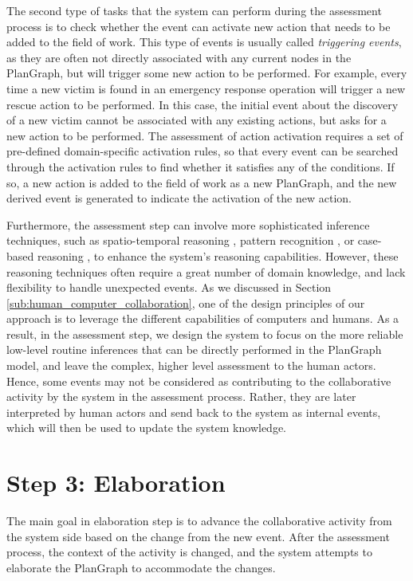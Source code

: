The second type of tasks that the system can perform during the assessment process is to check whether the event can activate new action that needs to be added to the field of work. This type of events is usually called \emph{triggering events}, as they are often not directly associated with any current nodes in the PlanGraph, but will trigger some new action to be performed. For example, every time a new victim is found in an emergency response operation will trigger a new rescue action to be performed. In this case, the initial event about the discovery of a new victim cannot be associated with any existing actions, but asks for a new action to be performed. The assessment of action activation requires a set of pre-defined domain-specific activation rules, so that every event can be searched through the activation rules to find whether it satisfies any of the conditions. If so, a new action is added to the field of work as a new PlanGraph, and the new derived event is generated to indicate the activation of the new action.

Furthermore, the assessment step can involve more sophisticated inference techniques, such as spatio-temporal reasoning \cite{Bennett}, pattern recognition \cite{zelnik2001event}, or case-based reasoning \cite{jakobson2004towards}, to enhance the system's reasoning capabilities. However, these reasoning techniques often require a great number of domain knowledge, and lack flexibility to handle unexpected events. As we discussed in Section \ref{sub:human_computer_collaboration}, one of the design principles of our approach is to leverage the different capabilities of computers and humans. As a result, in the assessment step, we design the system to focus on the more reliable low-level routine inferences that can be directly performed in the PlanGraph model, and leave the complex, higher level assessment to the human actors. Hence,
some events may not be considered as contributing to the collaborative activity by the system in the assessment process. Rather, they are later interpreted by human actors and send back to the system as internal events, which will then be used to update the system knowledge.

\section{Step 3: Elaboration} %
\label{sec:step_3_elaboration}
The main goal in elaboration step is to advance the collaborative activity from the system side based on the change from the new event. After the assessment process, the context of the activity is changed, and the system attempts to elaborate the PlanGraph to accommodate the changes. 

